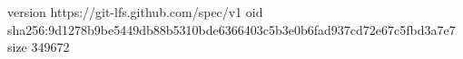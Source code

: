 version https://git-lfs.github.com/spec/v1
oid sha256:9d1278b9be5449db88b5310bde6366403c5b3e0b6fad937cd72e67c5fbd3a7e7
size 349672
